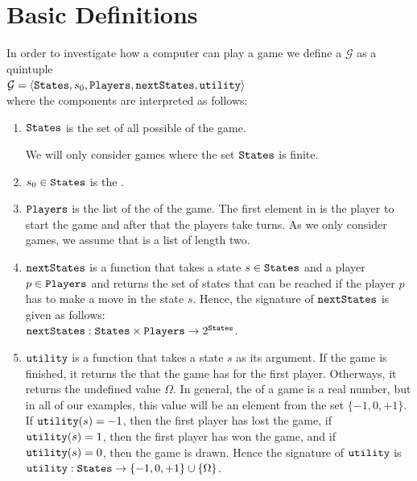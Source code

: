 \section{Basic Definitions}
In order to investigate how a computer can play a game we define a  $\mathcal{G}$ as a quintuple 
\\[0.2cm]
\hspace*{1.3cm}
$\mathcal{G} = \langle \texttt{States}, s_0, \texttt{Players}, \texttt{nextStates}, \texttt{utility} \rangle$
\\[0.2cm]
where the components are interpreted as follows:
\begin{enumerate}
\item $\texttt{States}$ is the set of all possible  of the game.

      We will only consider games where the set $\texttt{States}$ is finite.
\item $s_0 \in \texttt{States}$ is the .
\item $\texttt{Players}$ is  the list of the  of the game.  The first element in  is
      the player to start the game and after that the players take turns.  As we only consider 
      games, we assume that  is a list of length two.  
\item $\texttt{nextStates}$ is a function that takes a state $s \in \texttt{States}$ and a player $p \in \texttt{Players}$ and returns the set of
      states that can be reached if the player $p$ has to make a move in the state $s$.  Hence, the signature of
      $\texttt{nextStates}$ is given as follows:
      \\[0.2cm]
      \hspace*{1.3cm}
      $\texttt{nextStates}: \texttt{States} \times \texttt{Players} \rightarrow 2^{\texttt{States}}$.
\item $\texttt{utility}$ is a function that takes a state $s$ as its argument.  If the game is finished, it returns 
      the  that the game has for the first player.  Otherways, it returns the undefined value
      $\Omega$.  In general, the  of a game is a real number,  but in all of our examples, this
      value will be an element from the set 
      $\{-1, 0, +1\}$.  If $\texttt{utility}(s) = -1$,  
      then the first player has lost the game, if $\texttt{utility}(s) = 1$, then the first player has won the
      game, and if $\texttt{utility}(s) = 0$, then the game is drawn.  Hence the signature of $\texttt{utility}$ is
      \\[0.2cm]
      \hspace*{1.3cm}
      $\texttt{utility}: \texttt{States} \rightarrow \{ -1, 0, +1\} \cup \{ \Omega \}$.
\end{enumerate}

